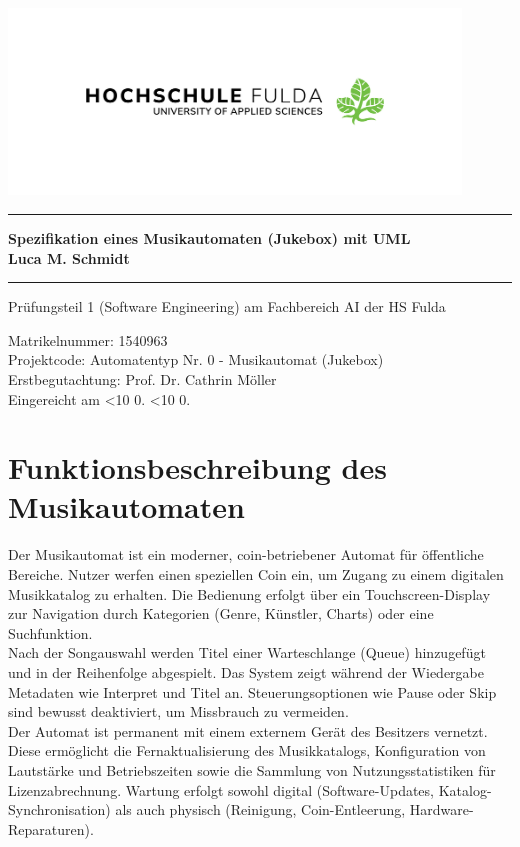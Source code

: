 \documentclass[12pt,oneside]{article}
\newcommand{\todayddmmyyyy}{%
  \ifnum\day<10 0\fi\the\day.%
  \ifnum\month<10 0\fi\the\month.%
  \the\year}
\newcommand{\HSFTitle}[8]{

  \thispagestyle{empty}
\begin{center}
    \includegraphics[width=0.9\textwidth]{logo_new_2.png} \\
    \vspace*{\stretch{1}}
    \end{center}

  {\parindent0cm
  \rule{\linewidth}{.7ex}}
  \begin{center}
    \vspace*{\stretch{1}}
    \sffamily\bfseries\Huge
    #1\\
    \vspace*{\stretch{1}}
    \sffamily\bfseries\large
    #3
    \vspace*{\stretch{1}}
  \end{center}
  \rule{\linewidth}{.7ex}

  \vspace*{\stretch{2}}
  \begin{center}
    \Large #2 am #5 der HS Fulda \\
    \vspace*{\stretch{1}}

    \large Matrikelnummer:  #4 \\[1mm]
    \large Projektcode: Automatentyp Nr. 0 - Musikautomat (Jukebox) \\[1mm]
    \large Erstbegutachtung:  #7 \\[1mm]

    \vspace*{\stretch{1}}
    \large Eingereicht am #6
  \end{center}
}
\begin{document}
  \HSFTitle
      {Spezifikation eines Musikautomaten (Jukebox) mit UML}       %
      {Prüfungsteil 1 (Software Engineering)} %
      {Luca M. Schmidt}          %
      {1540963}
      {Fachbereich AI}  %
      {\todayddmmyyyy}        %
      {Prof. Dr. Cathrin Möller}     %

  \clearpage

\lhead{}
    \setcounter{page}{1}

\tableofcontents
\listoffigures
\clearpage


\cleardoublepage
{}
    \setcounter{page}{1}
\lhead{\nouppercase{\leftmark}}


\section{Funktionsbeschreibung des Musikautomaten} \label{sec:funktionsbeschreibung}
Der Musikautomat ist ein moderner, coin-betriebener Automat für öffentliche Bereiche. Nutzer werfen einen speziellen Coin ein, um Zugang zu einem digitalen Musikkatalog zu erhalten. Die Bedienung erfolgt über ein Touchscreen-Display zur Navigation durch Kategorien (Genre, Künstler, Charts) oder eine Suchfunktion.\\
Nach der Songauswahl werden Titel einer Warteschlange (Queue) hinzugefügt und in der Reihenfolge abgespielt. Das System zeigt während der Wiedergabe Metadaten wie Interpret und Titel an. Steuerungsoptionen wie Pause oder Skip sind bewusst deaktiviert, um Missbrauch zu vermeiden.\\
Der Automat ist permanent mit einem externem Gerät des Besitzers vernetzt. Diese ermöglicht die Fernaktualisierung des Musikkatalogs, Konfiguration von Lautstärke und Betriebszeiten sowie die Sammlung von Nutzungsstatistiken für Lizenzabrechnung. Wartung erfolgt sowohl digital (Software-Updates, Katalog-Synchronisation) als auch physisch (Reinigung, Coin-Entleerung, Hardware-Reparaturen).
\end{document}
